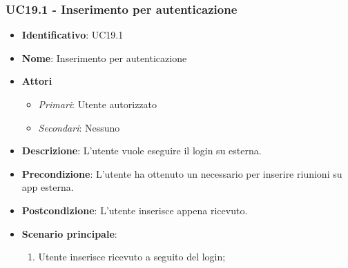 \subsubsection{UC19.1 - Inserimento  per autenticazione }
\begin{itemize}
	\item \textbf{Identificativo}: UC19.1
	\item \textbf{Nome}: Inserimento  per autenticazione
	\item \textbf{Attori}
	\begin{itemize} 
		\item \textit{Primari}: Utente autorizzato
		\item \textit{Secondari}: Nessuno
	\end{itemize}
	\item \textbf{Descrizione}: L'utente vuole eseguire il login su  esterna.
	\item \textbf{Precondizione}: L'utente ha ottenuto un  necessario per inserire riunioni su app esterna.
	\item \textbf{Postcondizione}: L'utente inserisce  appena ricevuto.
	\item \textbf{Scenario principale}: \begin{enumerate}
		\item Utente inserisce  ricevuto a seguito del login; 
	\end{enumerate}
\end{itemize}